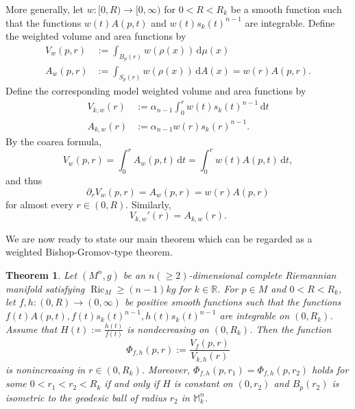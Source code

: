 \documentclass[11pt]{article}
\newtheorem{theorem}{Theorem}[section]
\newcommand{\Ric}{\operatorname{Ric}}
\newcommand{\dd}{\,\mathrm{d}}
\begin{document}
\noindent More generally, let $w\colon[0,R)\longrightarrow[0,\infty)$ for $0<R<R_k$ be a smooth function such that the functions $w(t)A(p,t)$ and $w(t)s_k(t)^{n-1}$ are integrable. Define the weighted volume and area functions by
\begin{align*}
V_w(p,r) &:= \int_{B_p(r)}w(\rho(x))\dd\mu(x) \\
A_w(p,r) &:= \int_{S_p(r)}w(\rho(x))\dd A(x) = w(r)A(p,r).
\end{align*}
Define the corresponding model weighted volume and area functions by
\begin{align*}
V_{k,w}(r) &:= \alpha_{n-1}\int_0^r w(t)s_k(t)^{n-1}\dd t \\
A_{k,w}(r) &:= \alpha_{n-1}w(r)s_k(r)^{n-1}.
\end{align*} 
By the coarea formula,
\[
V_w(p,r)
=
\int_0^r A_w(p,t)\dd t
=
\int_0^r w(t)A(p,t)\dd t,
\]
and thus
\[
\partial_r V_w(p,r)=A_w(p,r)=w(r)A(p,r)
\]
for almost every $r\in(0,R)$. Similarly,
\[
V_{k,w}'(r)=A_{k,w}(r).
\]





\noindent We are now ready to state our main theorem which can be regarded as a weighted Bishop-Gromov-type theorem.

\begin{theorem} \label{thm:main}
Let $(M^n,g)$ be an $n(\geq 2)$-dimensional complete Riemannian manifold satisfying $\Ric_M\geq(n-1)kg$ for \(k\in\mathbb{R}\). For \(p\in M\) and  \(0<R<R_k\), let $f,h\colon(0,R)\rightarrow(0,\infty)$ be positive smooth functions such that 
the functions $f(t)A(p,t), f(t)s_k(t)^{n-1}, h(t)s_k(t)^{n-1}$ are integrable on \((0,R_k)\). Assume that $H(t):=\frac{h(t)}{f(t)}$ is nondecreasing on \((0,R_k)\). Then the function 
$$\Phi_{f,h}(p,r) := \frac{V_f(p,r)}{V_{k,h}(r)}$$
 is nonincreasing in $r \in (0,R_k)$. Moreover, $\Phi_{f,h}(p,r_1)=\Phi_{f,h}(p,r_2)$ holds for some \(0<r_1<r_2<R_k\) if and only if \(H\) is constant on \((0,r_2)\) and $B_p(r_2)$ is isometric to the geodesic ball of radius $r_2$ in $\mathbb M_k^n$.
\end{theorem}
\end{document}
